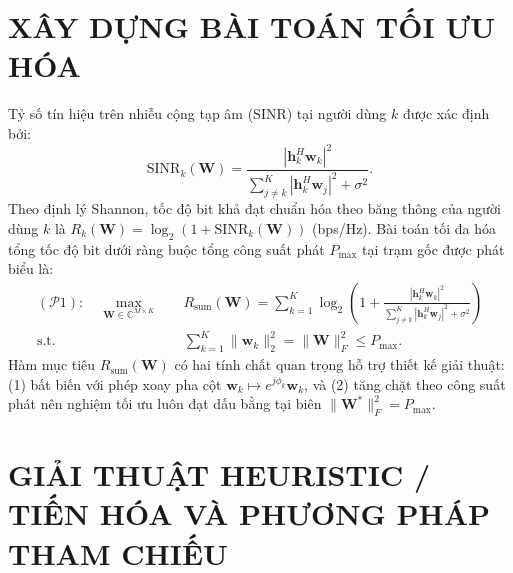\documentclass[12pt, a4paper]{article}
\begin{document}
\section{XÂY DỰNG BÀI TOÁN TỐI ƯU HÓA}
Tỷ số tín hiệu trên nhiễu cộng tạp âm (SINR) tại người dùng $k$ được xác định bởi:
\begin{equation}
    \text{SINR}_k(\mathbf{W}) = \frac{|\mathbf{h}_k^H \mathbf{w}_k|^2}{\sum_{j \neq k}^{K} |\mathbf{h}_k^H \mathbf{w}_j|^2 + \sigma^2}.
\end{equation}
Theo định lý Shannon, tốc độ bit khả đạt chuẩn hóa theo băng thông của người dùng $k$ là $R_k(\mathbf{W}) = \log_2(1 + \text{SINR}_k(\mathbf{W}))$ (bps/Hz). Bài toán tối đa hóa tổng tốc độ bit dưới ràng buộc tổng công suất phát $P_{\max}$ tại trạm gốc được phát biểu là:
\begin{align}
    (\mathcal{P}1): \quad \max_{\mathbf{W} \in \mathbb{C}^{M \times K}} \quad & R_{\text{sum}}(\mathbf{W}) = \sum_{k=1}^{K} \log_2 \!\left( 1 + \frac{|\mathbf{h}_k^H \mathbf{w}_k|^2}{\sum_{j \neq k}^{K} |\mathbf{h}_k^H \mathbf{w}_j|^2 + \sigma^2} \right) \\
    \text{s.t.} \quad & \sum_{k=1}^{K} \|\mathbf{w}_k\|_2^2 = \|\mathbf{W}\|_F^2 \le P_{\max}.
\end{align}
Hàm mục tiêu $R_{\text{sum}}(\mathbf{W})$ có hai tính chất quan trọng hỗ trợ thiết kế giải thuật: (1) bất biến với phép xoay pha cột $\mathbf{w}_k \mapsto e^{j\phi_k}\mathbf{w}_k$, và (2) tăng chặt theo công suất phát nên nghiệm tối ưu luôn đạt dấu bằng tại biên $\|\mathbf{W}^*\|_F^2 = P_{\max}$.

\section{GIẢI THUẬT HEURISTIC / TIẾN HÓA VÀ PHƯƠNG PHÁP THAM CHIẾU}
\end{document}
